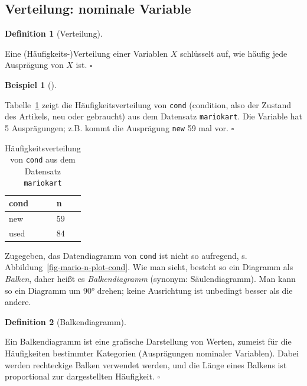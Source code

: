 \documentclass[
  letterpaper,
]{scrbook}
\theoremstyle{definition}
\theoremstyle{definition}
\newtheorem{example}{Beispiel}[chapter]
\theoremstyle{definition}
\newtheorem{definition}{Definition}[chapter]
\theoremstyle{remark}
\begin{document}
\subsection{Verteilung: nominale
Variable}\label{verteilung-nominale-variable}

\begin{definition}[Verteilung]\protect\hypertarget{def-verteilung}{}\label{def-verteilung}

Eine (Häufigkeits-)Verteilung einer Variablen \(X\) schlüsselt auf, wie
häufig jede Ausprägung von \(X\) ist. \(\square\)

\end{definition}

\begin{example}[]\protect\hypertarget{exm-verteilung1}{}\label{exm-verteilung1}

Tabelle~\ref{tbl-wheels-n} zeigt die Häufigkeitsverteilung von
\texttt{cond} (condition, also der Zustand des Artikels, neu oder
gebraucht) aus dem Datensatz \texttt{mariokart}. Die Variable hat 5
Ausprägungen; z.B. kommt die Ausprägung \texttt{new} 59 mal vor.
\(\square\)

\end{example}

\begin{longtable}[]{@{}ll@{}}

\caption{\label{tbl-wheels-n}Häufigkeitsverteilung von \texttt{cond} aus
dem Datensatz \texttt{mariokart}}

\tabularnewline

\toprule\noalign{}
cond & n \\
\midrule\noalign{}
\endhead
\bottomrule\noalign{}
\endlastfoot
new & 59 \\
used & 84 \\

\end{longtable}

Zugegeben, das Datendiagramm von \texttt{cond} ist nicht so aufregend,
s. Abbildung~\ref{fig-mario-n-plot-cond}. Wie man sieht, besteht so ein
Diagramm als \emph{Balken}, daher heißt es \emph{Balkendiagramm}
(synonym: Säulendiagramm). Man kann so ein Diagramm um 90° drehen; keine
Ausrichtung ist unbedingt besser als die andere.

\begin{definition}[Balkendiagramm]\protect\hypertarget{def-balken}{}\label{def-balken}

Ein Balkendiagramm ist eine grafische Darstellung von Werten, zumeist
für die Häufigkeiten bestimmter Kategorien (Ausprägungen nominaler
Variablen). Dabei werden rechteckige Balken verwendet werden, und die
Länge eines Balkens ist proportional zur dargestellten Häufigkeit.
\(\square\)

\end{definition}
\end{document}
